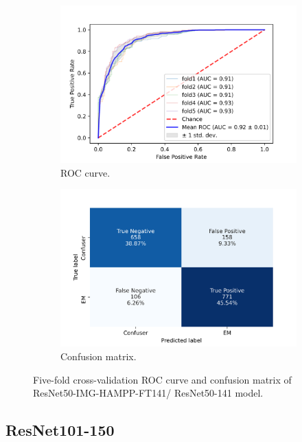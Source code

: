 \begin{figure}[h!]
	\centering
	\begin{subfigure}[b]{0.49\textwidth}
		\centering
		\includegraphics[width=\textwidth,keepaspectratio]{images/Supplement4/image69.png}
		\caption{ROC curve.}
	\end{subfigure}
	\hfill
	\begin{subfigure}[b]{0.49\textwidth}
		\centering
		\includegraphics[width=\textwidth,keepaspectratio]{images/Supplement4/image75.png}
		\caption{Confusion matrix.}
	\end{subfigure}
	\caption{Five-fold cross-validation ROC curve and confusion matrix of ResNet50-IMG-HAMPP-FT141/ ResNet50-141 model.}
\end{figure}

\vfill\clearpage
\subsection{ResNet101-150}

